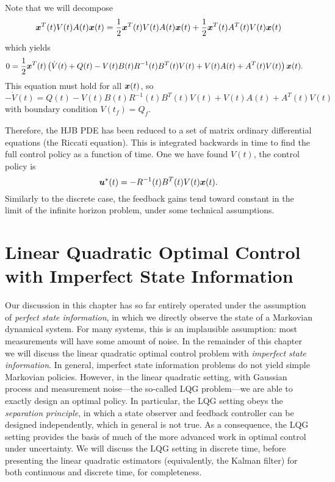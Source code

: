 Note that we will decompose
\begin{equation}
    \bm{x}^T(t) V(t) A(t) \bm{x}(t) = \frac{1}{2} \bm{x}^T(t) V(t) A(t) \bm{x}(t) + \frac{1}{2} \bm{x}^T(t) A^T(t) V(t) \bm{x}(t)
\end{equation}
which yields
\begin{align}
    0 &= \frac{1}{2} \bm{x}^T(t) \left(\dot{V}(t) + Q(t) - V(t) B(t) R^{-1}(t) B^T(t) V(t) + V(t) A(t) + A^T(t) V(t)\right) \bm{x}(t).
\end{align}
This equation must hold for all $\bm{x}(t)$, so 
\begin{equation}
    -\dot{V}(t) = Q(t) - V(t) B(t) R^{-1}(t) B^T(t) V(t) + V(t) A(t) + A^T(t) V(t)
\end{equation}
with boundary condition $V(t_f) = Q_f$.

Therefore, the HJB PDE has been reduced to a set of matrix ordinary differential equations (the Riccati equation). This is integrated backwards in time to find the full control policy as a function of time. One we have found $V(t)$, the control policy is
\begin{equation}
    \bm{u}^*(t) = - R^{-1}(t) B^T(t) V(t) \bm{x}(t).
\end{equation}
Similarly to the discrete case, the feedback gains tend toward constant in the limit of the infinite horizon problem, under some technical assumptions.

\section{Linear Quadratic Optimal Control with Imperfect State Information}

Our discussion in this chapter has so far entirely operated under the assumption of \textit{perfect state information}, in which we directly observe the state of a Markovian dynamical system. For many systems, this is an implausible assumption: most measurements will have some amount of noise. In the remainder of this chapter we will discuss the linear quadratic optimal control problem with \textit{imperfect state information}. In general, imperfect state information problems do not yield simple Markovian policies. However, in the linear quadratic setting, with Gaussian process and measurement noise---the so-called LQG problem---we are able to exactly design an optimal policy. In particular, the LQG setting obeys the \textit{separation principle}, in which a state observer and feedback controller can be designed independently, which in general is not true. As a consequence, the LQG setting provides the basis of much of the more advanced work in optimal control under uncertainty. We will discuss the LQG setting in discrete time, before presenting the linear quadratic estimators (equivalently, the Kalman filter) for both continuous and discrete time, for completeness. 

